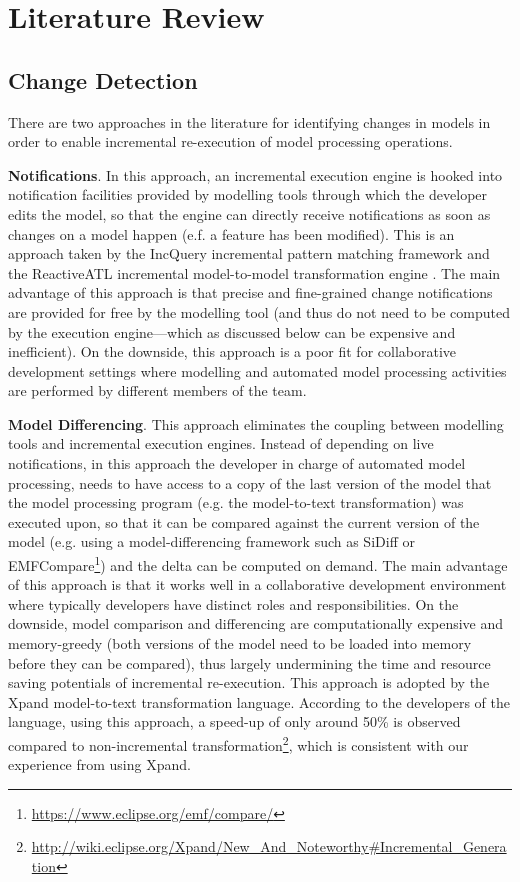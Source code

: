 \documentclass[12pt, a4paper]{report} \usepackage[titletoc]{appendix}
\begin{document}
\section{Literature Review}
\label{sec:literature_review}

\subsection{Change Detection}
\label{subsec:change_detection}
There are two approaches in the literature for identifying changes in models in order to enable incremental re-execution of model processing operations.

\textbf{Notifications}. In this approach, an incremental execution engine is hooked into notification facilities provided by modelling tools through which the developer edits the model, so that the engine can directly receive notifications as soon as changes on a model happen (e.f. a feature has been modified). This is an approach taken by the IncQuery incremental pattern matching framework \cite{rath2012derived} and the ReactiveATL incremental model-to-model transformation engine \cite{ogunyomi2015property}. The main advantage of this approach is that precise and fine-grained change notifications are provided for free by the modelling tool (and thus do not need to be computed by the execution engine---which as discussed below can be expensive and inefficient). On the downside, this approach is a poor fit for collaborative development settings where modelling and automated model processing activities are performed by different members of the team.

\textbf{Model Differencing}. This approach eliminates the coupling between modelling tools and incremental execution engines. Instead of depending on live notifications, in this approach the developer in charge of automated model processing, needs to have access to a copy of the last version of the model that the model processing program (e.g. the model-to-text transformation) was executed upon, so that it can be compared against the current version of the model (e.g. using a model-differencing framework such as SiDiff \cite{kelter2005generic} or EMFCompare\footnote{\url{https://www.eclipse.org/emf/compare/}}) and the delta can be computed on demand. The main advantage of this approach is that it works well in a collaborative development environment where typically developers have distinct roles and responsibilities. On the downside, model comparison and differencing are computationally expensive and memory-greedy (both versions of the model need to be loaded into memory before they can be compared), thus largely undermining the time and resource saving potentials of incremental re-execution. This approach is adopted by the Xpand model-to-text transformation language. According to the developers of the language, using this approach, a speed-up of only around 50\% is observed compared to non-incremental transformation\footnote{\url{http://wiki.eclipse.org/Xpand/New_And_Noteworthy\#Incremental_Generation}}, which is consistent with our experience from using Xpand.
\end{document}

